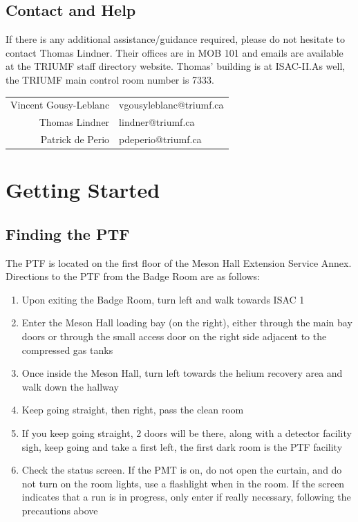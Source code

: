 \documentclass[twoside,letterpaper]{refart}
\begin{document}
\subsection{Contact and Help}

If there is any additional assistance/guidance required, please do not hesitate to contact Thomas Lindner. Their offices are in MOB 101 and emails are available at the TRIUMF staff directory website. Thomas' building is at ISAC-II.\@ As well, the TRIUMF main control room number is 7333.

\begin{center}\begin{tabular}{rl}
	Vincent Gousy-Leblanc & vgousyleblanc@triumf.ca \\
	Thomas Lindner & lindner@triumf.ca \\
	Patrick de Perio     & pdeperio@triumf.ca
\end{tabular}\end{center}

\newpage

\section{Getting Started}

\subsection{Finding the PTF}

The PTF is located on the first floor of the Meson Hall Extension Service Annex. Directions to the PTF from the Badge Room are as follows:

\begin{enumerate}
	\item Upon exiting the Badge Room, turn left and walk towards ISAC 1
	\item Enter the Meson Hall loading bay (on the right), either through the main bay doors or through the small access door on the right side adjacent to the compressed gas tanks
	\item Once inside the Meson Hall, turn left towards the helium recovery area and walk down the hallway
	\item Keep going straight, then right, pass the clean room
	\item If you keep going straight, 2 doors will be there, along with a detector facility sigh, keep going and take a first left, the first dark room is the PTF facility
	\item Check the status screen. If the PMT is on, do not open the curtain, and do not turn on the room lights, use a flashlight when in the room. If the screen indicates that a run is in progress, only enter if really necessary, following the precautions above
\end{enumerate}
\end{document}
